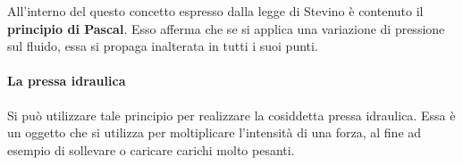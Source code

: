 \documentclass[10pt,a4paper]{book}
\begin{document}
All'interno del questo concetto espresso dalla legge di Stevino è contenuto il \textbf{principio di Pascal}. Esso afferma che se si applica una variazione di pressione sul fluido, essa si propaga inalterata in tutti i suoi punti.

\paragraph{La pressa idraulica} Si può utilizzare tale principio per realizzare la cosiddetta pressa idraulica. Essa è un oggetto che si utilizza per moltiplicare l'intensità di una forza, al fine ad esempio di sollevare o caricare carichi molto pesanti.
\begin{figure}[htpb]
	\centering
	


	\begin{tikzpicture}[x=0.75pt,y=0.75pt,yscale=-1,xscale=1]


\end{tikzpicture}
\end{figure}
\end{document}
